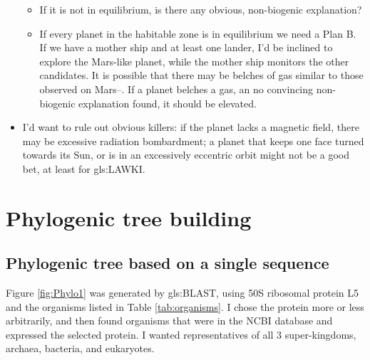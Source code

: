 \documentclass[]{article}
\begin{document}
\begin{itemize}
	\begin{itemize}
		\item If it is not in equilibrium, is there any obvious, non-biogenic explanation?
		\item If every planet in the habitable zone is in equilibrium we need a Plan B. If we have a mother ship and at least one lander, I'd be inclined to explore the Mars-like planet, while the mother ship monitors the other candidates. It is possible that there may be belches of gas similar to those observed on Mars--\cite{nasa2019curiosity}. If a planet belches a gas, an no convincing non-biogenic explanation found, it should be elevated. 
	\end{itemize}
	\item I'd want to rule out obvious killers: if the planet lacks a magnetic field, there may be excessive radiation bombardment; a planet that keeps one face turned towards its Sun, or is in an excessively eccentric orbit might not be a good bet, at least for \gls{gls:LAWKI}.  
\end{itemize}

\section{Phylogenic tree building}

\subsection{Phylogenic tree based on a single sequence}

Figure \ref{fig:Phylo1} was generated by \gls{gls:BLAST}, using 50S ribosomal protein L5 and the organisms listed in Table \ref{tab:organisms}. I chose the protein more or less arbitrarily, and then found organisms that were in the NCBI database and expressed the selected protein. I wanted representatives of all 3 super-kingdoms, archaea, bacteria, and eukaryotes.
\end{document}
